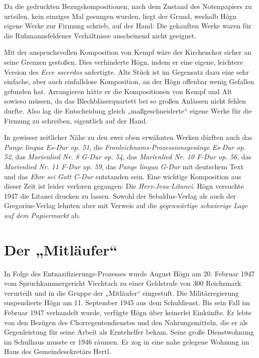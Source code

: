 \documentclass{book}
\begin{document}
Da die gedruckten Bezugskompositionen, nach dem Zustand des
Noten\-papiers zu urteilen, kein einziges Mal gesungen wurden, liegt
der Grund, wes\-halb Högn eigene Werke zur Firmung schrieb, auf der
Hand: Die gekauften Werke waren für die Ruhmannsfeldener Verhältnisse
anscheinend nicht ge\-eignet.

Mit der anspruchsvollen Komposition von Kempf wäre der Kirchenchor
sicher an seine Grenzen gestoßen. Dies verhinderte Högn, indem er eine
eigene, leichtere Version des \textit{Ecce sacerdos} anfertigte. Alts
Stück ist im Gegen\-satz dazu eine sehr einfache, aber auch
einfallslose Komposition, an der Högn offenbar wenig Gefallen gefunden
hat. Arrangieren hätte er die Kompo\-sitionen von Kempf und Alt sowieso
müssen, da das Blechbläserquartett bei so großen Anlässen nicht fehlen
durfte. Also lag die Entscheidung gleich „maßgeschneiderte“ eigene
Werke für die Firmung zu schreiben, eigentlich auf der Hand. 

In gewisser zeitlicher Nähe zu den zwei oben erwähnten Werken dürften
auch das \textit{Pange lingua Es-Dur op. 51}, die
\textit{Fronleichnams-Prozessionsgesänge} \textit{Es-Dur op. 52}, das
\textit{Marienlied Nr. 8 G-Dur op. 54}, das \textit{Marienlied Nr. 10
F-Dur op. 56}, das \textit{Marienlied Nr. 11 F-Dur op. 59}, das
\textit{Pange lingua G-Dur} mit deutschem Text und das \textit{Ehre sei
Gott C-Dur} entstanden sein. Eine wichtige Komposition aus dieser Zeit
ist leider verloren gegangen: Die \textit{Herz-Jesu-Litanei}. Högn
versuchte 1947 die Litanei drucken zu lassen. Sowohl der
Sebaldus-Verlag als auch der Gregorius-Verlag lehnten aber mit Verweis
auf die \textit{gegenwärtige schwierige Lage auf dem Papiermarkt} ab.

\section{Der „Mitläufer“}
In Folge des Entnazifizierungs-Prozesses wurde August Högn am 20.
Februar 1947 vom Spruchkammergericht Viechtach zu einer Geldstrafe von
300 Reichsmark verurteilt und in die Gruppe der „Mitläufer“ eingestuft.
Die Mili\-tärregierung suspendierte Högn am 11. September 1945 aus dem
Schuldienst. Bis sein Fall im Februar 1947 verhandelt wurde, verfügte
Högn über keinerlei Einkünfte. Er lebte von den Bezügen des
Chorregentendienstes und den Nahrungsmitteln, die er als Gegenleistung
für seine Arbeit als Erntehelfer bekam. Seine große Dienstwohnung im
Schulhaus musste er 1946 räumen. Er zog in eine nahe gelegene Wohnung
im Haus des Gemeindesekretärs Hertl.
\end{document}

